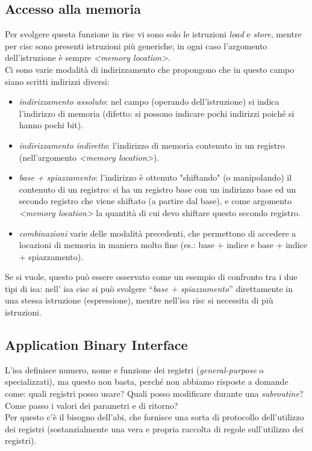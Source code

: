 \documentclass[class=book, crop=false, oneside]{standalone}
\begin{document}
\subsection{Accesso alla memoria}
Per svolgere questa funzione in \acrshort{risc} vi sono solo le istruzioni \emph{load} e \emph{store}, mentre per \acrshort{cisc} sono presenti istruzioni più generiche; in ogni caso l’argomento dell’istruzione è sempre \emph{<memory location>}.\\
Ci sono varie modalità di indirizzamento che propongono che in questo campo siano scritti indirizzi diversi:
\begin{itemize}
	\item \emph{indirizzamento assoluto}: nel campo (operando dell’istruzione) si indica l’indirizzo di memoria (difetto: si possono indicare pochi indirizzi poiché si hanno pochi bit).
	\item \emph{indirizzamento indiretto}: l’indirizzo di memoria contenuto in un registro (nell’argomento \emph{<memory location>}).
	\item \emph{base + spiazzamento}: l’indirizzo è ottenuto "shiftando" (o manipolando) il contenuto di un registro: si ha un registro base con un indirizzo base ed un secondo registro che viene shiftato (a partire dal base), e come argomento \emph{<memory location>} la quantità di cui devo shiftare questo secondo registro.
	\item \emph{combinazioni} varie delle modalità precedenti, che permettono di accedere a locazioni di memoria in maniera molto fine (es.: base + indice e base + indice + spiazzamento).
\end{itemize}

Se si vuole, questo può essere osservato come un esempio di confronto tra i due tipi di \acrshort{isa}: nell’ \acrshort{isa} \acrshort{cisc} si può svolgere “\emph{base + spiazzamento}” direttamente in una stessa istruzione (espressione), mentre nell'\acrshort{isa} \acrshort{risc} si necessita di più istruzioni.

\subsection{Application Binary Interface}
L'\acrshort{isa} definisce numero, nome e funzione dei registri (\emph{general-purpose} o  specializzati), ma questo non basta, perché non abbiamo risposte a domande come: quali registri posso usare? Quali posso modificare durante una \emph{subroutine}? Come passo i valori dei parametri e di ritorno?\\
Per questo c’è il bisogno dell'\acrfull{abi}, che fornisce una sorta di protocollo dell’utilizzo dei registri (sostanzialmente una vera e propria raccolta di regole sull’utilizzo dei registri).
\end{document}
